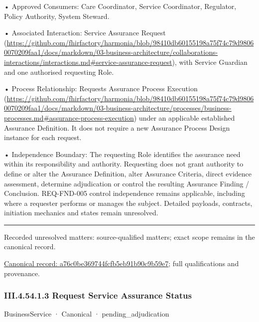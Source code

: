 •
Approved Consumers: Care Coordinator, Service Coordinator, Regulator, Policy Authority, System Steward.



•
Associated Interaction: Service Assurance Request (\url{https://github.com/fhirfactory/harmonia/blob/98410db60155198a75f74c79d98060070209faa1/docs/markdown/03-business-architecture/collaborations-interactions/interactions.md#service-assurance-request}), with Service Guardian and one authorised requesting Role.



•
Process Relationship: Requests Assurance Process Execution (\url{https://github.com/fhirfactory/harmonia/blob/98410db60155198a75f74c79d98060070209faa1/docs/markdown/03-business-architecture/processes/business-processes.md#assurance-process-execution}) under an applicable established Assurance Definition. It does not require a new Assurance Process Design instance for each request.



•
Independence Boundary: The requesting Role identifies the assurance need within its responsibility and authority. Requesting does not grant authority to define or alter the Assurance Definition, alter Assurance Criteria, direct evidence assessment, determine adjudication or control the resulting Assurance Finding / Conclusion. REQ-FND-005 control independence remains applicable, including where a requester performs or manages the subject. Detailed payloads, contracts, initiation mechanics and states remain unresolved.



\medskip\hrule\medskip

{\small Recorded unresolved matters: source-qualified matters; exact scope remains in the canonical record.}\par
{\footnotesize \href{../../../../continuum/business/business-service/a76c0be369744fcfb5eb91b90c9b59e7.md}{Canonical record: a76c0be369744fcfb5eb91b90c9b59e7}; full qualifications and provenance.}\par
\subsubsection*{III.4.54.1.3 Request Service Assurance Status}
\label{navigation:III.4.54.1.3}

\label{element:60f8cbc814614f669f31d4e78734c6d6}
{\small BusinessService · Canonical · pending\_adjudication}\par

